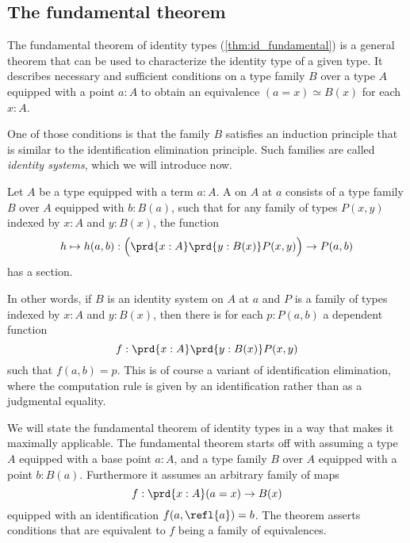\subsection{The fundamental theorem}


The fundamental theorem of identity types (\cref{thm:id_fundamental}) is a general theorem that can be used to characterize the identity type of a given type. It describes necessary and sufficient conditions on a type family $B$ over a type $A$ equipped with a point $a:A$ to obtain an equivalence $(a=x)\simeq B(x)$ for each $x:A$.

One of those conditions is that the family $B$ satisfies an induction principle that is similar to the identification elimination principle. Such families are called \emph{identity systems}, which we will introduce now.

\begin{defn}\label{defn:identity-system}
  Let $A$ be a type equipped with a term $a:A$. A  on $A$ at $a$ consists of a type family $B$ over $A$ equipped with $b:B(a)$, such that for any family of types $P(x,y)$ indexed by $x:A$ and $y:B(x)$,
  the function
  \begin{equation*}
    h\mapsto h(a,b):\Big(\prd{x:A}\prd{y:B(x)}P(x,y)\Big)\to P(a,b)
  \end{equation*}
  has a section.  
\end{defn}

In other words, if $B$ is an identity system on $A$ at $a$ and $P$ is a family of types indexed by $x:A$ and $y:B(x)$, then there is for each $p:P(a,b)$ a dependent function
\begin{equation*}
  f:\prd{x:A}\prd{y:B(x)}P(x,y)
\end{equation*}
such that $f(a,b)=p$. This is of course a variant of identification elimination, where the computation rule is given by an identification rather than as a judgmental equality.

We will state the fundamental theorem of identity types in a way that makes it maximally applicable. The fundamental theorem starts off with assuming a type $A$ equipped with a base point $a:A$, and a type family $B$ over $A$ equipped with a point $b:B(a)$. Furthermore it assumes an arbitrary family of maps
\begin{equation*}
  f:\prd{x:A}(a=x)\to B(x)
\end{equation*}
equipped with an identification $f(a,\refl{a})=b$. The theorem asserts conditions that are equivalent to $f$ being a family of equivalences.


